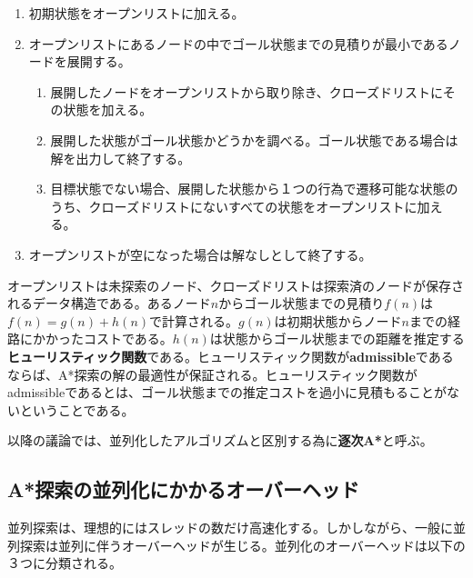 \documentclass[uplatex]{jsarticle}
\begin{document}
\begin{enumerate}
	\item 初期状態をオープンリストに加える。
	\item オープンリストにあるノードの中でゴール状態までの見積りが最小であるノードを展開する。
	\begin{enumerate}
		\item 展開したノードをオープンリストから取り除き、クローズドリストにその状態を加える。
		\item 展開した状態がゴール状態かどうかを調べる。ゴール状態である場合は解を出力して終了する。
		\item 目標状態でない場合、展開した状態から１つの行為で遷移可能な状態のうち、クローズドリストにないすべての状態をオープンリストに加える。
	\end{enumerate}
	\item オープンリストが空になった場合は解なしとして終了する。
\end{enumerate}

オープンリストは未探索のノード、クローズドリストは探索済のノードが保存されるデータ構造である。あるノード$n$からゴール状態までの見積り$f(n)$は$f(n) = g(n) + h(n)$で計算される。$g(n)$は初期状態からノード$n$までの経路にかかったコストである。$h(n)$は状態からゴール状態までの距離を推定する\textbf{ヒューリスティック関数}である。ヒューリスティック関数が\textbf{admissible}であるならば、A*探索の解の最適性が保証される。ヒューリスティック関数がadmissibleであるとは、ゴール状態までの推定コストを過小に見積もることがないということである。



以降の議論では、並列化したアルゴリズムと区別する為に\textbf{逐次A*}と呼ぶ。


\subsection{A*探索の並列化にかかるオーバーヘッド}

並列探索は、理想的にはスレッドの数だけ高速化する。しかしながら、一般に並列探索は並列に伴うオーバーヘッドが生じる。並列化のオーバーヘッドは以下の３つに分類される。
\end{document}
